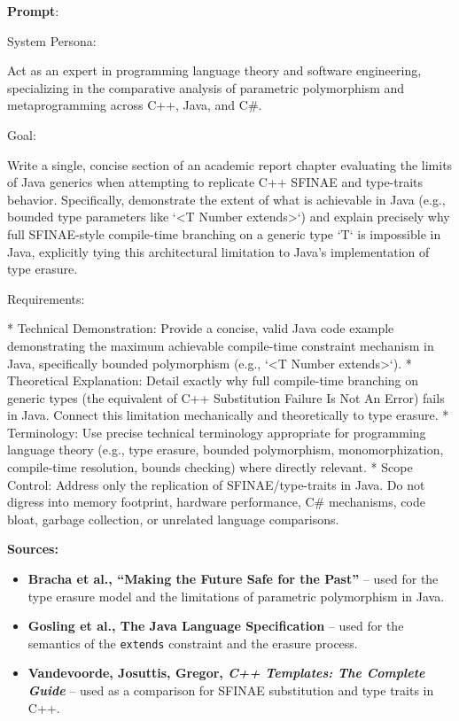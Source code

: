 \documentclass[11pt]{report}
\begin{document}
\noindent\textbf{Prompt}:
\begin{PromptVerbatim}
System Persona:

Act as an expert in programming language theory and software engineering, specializing in the comparative analysis of parametric polymorphism and metaprogramming across C++, Java, and C\#.

Goal:

Write a single, concise section of an academic report chapter evaluating the limits of Java generics when attempting to replicate C++ SFINAE and type-traits behavior. Specifically, demonstrate the extent of what is achievable in Java (e.g., bounded type parameters like `<T Number extends>`) and explain precisely why full SFINAE-style compile-time branching on a generic type `T` is impossible in Java, explicitly tying this architectural limitation to Java's implementation of type erasure.

Requirements:

* Technical Demonstration: Provide a concise, valid Java code example demonstrating the maximum achievable compile-time constraint mechanism in Java, specifically bounded polymorphism (e.g., `<T Number extends>`).
* Theoretical Explanation: Detail exactly why full compile-time branching on generic types (the equivalent of C++ Substitution Failure Is Not An Error) fails in Java. Connect this limitation mechanically and theoretically to type erasure.
* Terminology: Use precise technical terminology appropriate for programming language theory (e.g., type erasure, bounded polymorphism, monomorphization, compile-time resolution, bounds checking) where directly relevant.
* Scope Control: Address only the replication of SFINAE/type-traits in Java. Do not digress into memory footprint, hardware performance, C\# mechanisms, code bloat, garbage collection, or unrelated language comparisons.
\end{PromptVerbatim}

\noindent\textbf{Sources:}
\begin{itemize}
\item \textbf{Bracha et al., ``Making the Future Safe for the Past''} \cite{bracha1998} -- used for the type erasure model and the limitations of parametric polymorphism in Java.
\item \textbf{Gosling et al., The Java Language Specification} \cite{gosling2014java} -- used for the semantics of the \texttt{extends} constraint and the erasure process.
\item \textbf{Vandevoorde, Josuttis, Gregor, \emph{C++ Templates: The Complete Guide}} \cite{cpp_templates2017} -- used as a comparison for SFINAE substitution and type traits in C++.
\end{itemize}
\end{document}
